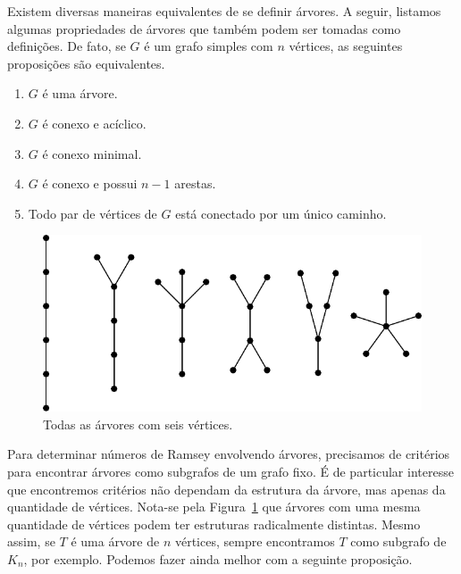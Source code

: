 Existem diversas maneiras equivalentes de se definir árvores. A seguir, listamos algumas propriedades de árvores que também podem ser tomadas como definições. De fato, se $G$ é um grafo simples com $n$ vértices, as seguintes proposições são equivalentes.

\begin{enumerate}[label=\arabic*.,itemindent=*]
  \item $G$ é uma árvore.
  \item $G$ é conexo e acíclico.
  \item $G$ é conexo minimal.
  \item $G$ é conexo e possui $n-1$ arestas.
  \item Todo par de vértices de $G$ está conectado por um único caminho.
\end{enumerate}

\begin{figure}[ht!]
\centering
\includegraphics{figures/3_graph_5_tree6}
\caption{Todas as árvores com seis vértices.}
\label{graph:fig:tree6}
\end{figure}

Para determinar números de Ramsey envolvendo árvores, precisamos de critérios para encontrar árvores como subgrafos de um grafo fixo. É de particular interesse que encontremos critérios não dependam da estrutura da árvore, mas apenas da quantidade de vértices. Nota-se pela Figura~\ref{graph:fig:tree6} que árvores com uma mesma quantidade de vértices podem ter estruturas radicalmente distintas. Mesmo assim, se $T$ é uma árvore de $n$ vértices, sempre encontramos $T$ como subgrafo de $K_n$, por exemplo. Podemos fazer ainda melhor com a seguinte proposição.

